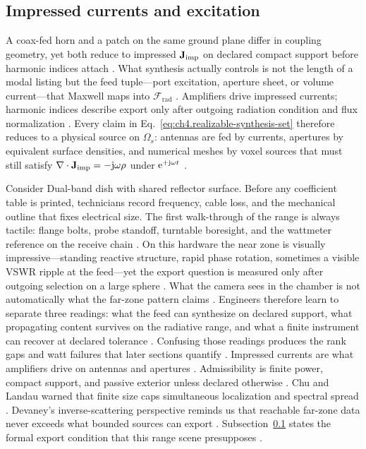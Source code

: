 \subsection{Impressed currents and excitation}
\label{sec:ch411}
A coax-fed horn and a patch on the same ground plane differ in coupling geometry, yet both reduce to impressed $\mathbf{J}_{\mathrm{imp}}$ on declared compact support before harmonic indices attach \cite{stratton1941}.
What synthesis actually controls is not the length of a modal listing but the feed tuple---port excitation, aperture sheet, or volume current---that Maxwell maps into $\mathcal{F}_{\mathrm{rad}}$ \cite{harrington2001}.
Amplifiers drive impressed currents; harmonic indices describe export only after outgoing radiation condition and flux normalization \cite{stratton1941}.
Every claim in Eq.~\eqref{eq:ch4.realizable-synthesis-set} therefore reduces to a physical source on $\Omega_s$: antennas are fed by currents, apertures by equivalent surface densities, and numerical meshes by voxel sources that must still satisfy $\nabla\cdot\mathbf{J}_{\mathrm{imp}}=-\mathrm{j}\omega\rho$ under $\mathrm{e}^{+\mathrm{j}\omega t}$ \cite{stratton1941}.
\begin{physicalvignette}
Consider Dual-band dish with shared reflector surface. Before any coefficient table is printed, technicians record frequency, cable loss, and the mechanical outline that fixes electrical size. The first walk-through of the range is always tactile: flange bolts, probe standoff, turntable boresight, and the wattmeter reference on the receive chain \cite{hansen1988}.
On this hardware the near zone is visually impressive---standing reactive structure, rapid phase rotation, sometimes a visible VSWR ripple at the feed---yet the export question is measured only after outgoing selection on a large sphere \cite{harrington2001}. What the camera sees in the chamber is not automatically what the far-zone pattern claims \cite{stratton1941}.
Engineers therefore learn to separate three readings: what the feed can synthesize on declared support, what propagating content survives on the radiative range, and what a finite instrument can recover at declared tolerance \cite{devaney2004}. Confusing those readings produces the rank gaps and watt failures that later sections quantify \cite{pal2026}.
Impressed currents are what amplifiers drive on antennas and apertures . Admissibility is finite power, compact support, and passive exterior unless declared otherwise .
Chu and Landau warned that finite size caps simultaneous localization and spectral spread \cite{chu1948}. Devaney's inverse-scattering perspective reminds us that reachable far-zone data never exceeds what bounded sources can export \cite{devaney2004}.
Subsection~\ref{sec:ch411} states the formal export condition that this range scene presupposes \cite{stratton1941}.
\end{physicalvignette}
